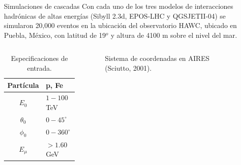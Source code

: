 \documentclass[10pt,xcolor=table]{beamer}
\begin{document}
\begin{frame}{Simulaciones de cascadas}
Con cada uno de los tres modelos de interacciones hadrónicas de altas energías (Sibyll 2.3d, EPOS-LHC y QGSJETII-04) se simularon 20,000 eventos en la ubicaci\'on  del observatorio HAWC, ubicado en Puebla, M\'exico, con latitud de 19$^{o}$ y altura de 4100 m sobre el nivel del mar. \\
	\begin{columns}
		\begin{column}{0.5\textwidth}
			\begin{table}[]
			\caption{Especificaciones de entrada.}
				\begin{tabular}{@{}cl@{}}
				{\color[HTML]{0E3EF0} Part\'icula} & p, Fe      		\\ \midrule
				{\color[HTML]{0E3EF0} $E_0$}       & $1-100$ TeV  	\\ \midrule
				{\color[HTML]{0E3EF0} $\theta_0$}  & $0-45^{\circ}$	\\ \midrule
				{\color[HTML]{0E3EF0} $\phi_0$}    & $0-360^{\circ}$	\\ \midrule
				{\color[HTML]{0E3EF0} $E_{\mu}$}   & $> 1.60$ GeV 
				\end{tabular}
			\end{table}
		\end{column}
		
		\begin{column}{0.5\textwidth}
		\vspace{0.7cm}
			\begin{center}
			\begin{figure}
			\caption{{\footnotesize Sistema de coordenadas en AIRES (Sciutto, 2001).}}
			\end{figure}
			\end{center}
		\end{column}
	
	\end{columns}
	
\end{frame}
\end{document}
